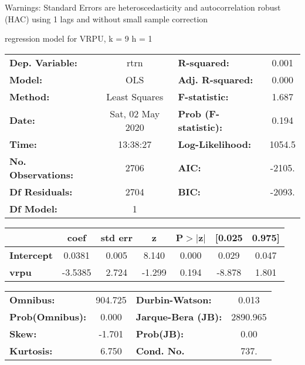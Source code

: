 Warnings: \newline
 [1] Standard Errors are heteroscedasticity and autocorrelation robust (HAC) using 1 lags and without small sample correction\ 

regression model for VRPU, k = 9 h = 1\begin{center}
\begin{tabular}{lclc}
\toprule
\textbf{Dep. Variable:}    &       rtrn       & \textbf{  R-squared:         } &     0.001   \\
\textbf{Model:}            &       OLS        & \textbf{  Adj. R-squared:    } &     0.000   \\
\textbf{Method:}           &  Least Squares   & \textbf{  F-statistic:       } &     1.687   \\
\textbf{Date:}             & Sat, 02 May 2020 & \textbf{  Prob (F-statistic):} &    0.194    \\
\textbf{Time:}             &     13:38:27     & \textbf{  Log-Likelihood:    } &    1054.5   \\
\textbf{No. Observations:} &        2706      & \textbf{  AIC:               } &    -2105.   \\
\textbf{Df Residuals:}     &        2704      & \textbf{  BIC:               } &    -2093.   \\
\textbf{Df Model:}         &           1      & \textbf{                     } &             \\
\bottomrule
\end{tabular}
\begin{tabular}{lcccccc}
                   & \textbf{coef} & \textbf{std err} & \textbf{z} & \textbf{P$> |$z$|$} & \textbf{[0.025} & \textbf{0.975]}  \\
\midrule
\textbf{Intercept} &       0.0381  &        0.005     &     8.140  &         0.000        &        0.029    &        0.047     \\
\textbf{vrpu}      &      -3.5385  &        2.724     &    -1.299  &         0.194        &       -8.878    &        1.801     \\
\bottomrule
\end{tabular}
\begin{tabular}{lclc}
\textbf{Omnibus:}       & 904.725 & \textbf{  Durbin-Watson:     } &    0.013  \\
\textbf{Prob(Omnibus):} &   0.000 & \textbf{  Jarque-Bera (JB):  } & 2890.965  \\
\textbf{Skew:}          &  -1.701 & \textbf{  Prob(JB):          } &     0.00  \\
\textbf{Kurtosis:}      &   6.750 & \textbf{  Cond. No.          } &     737.  \\
\bottomrule
\end{tabular}
\end{center}


